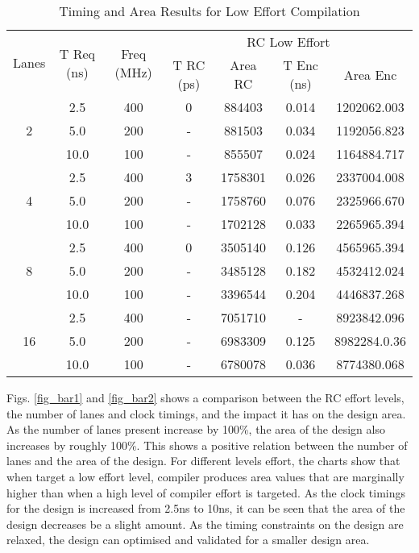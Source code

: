 \documentclass[conference]{IEEEtran}
\begin{document}
\begin{table}[!t]
	\renewcommand{\arraystretch}{1.3}
	\caption{Timing and Area Results for Low Effort Compilation }
	\label{table_example2}
	\centering
	\begin{tabular}{|c|c|c|c|c|c|c|}
		\hline
		\multirow{3}{*}{Lanes} & \multirow{3}{0.8cm}{T Req (ns)} &\multirow{3}{0.7cm}{Freq (MHz)} & \multicolumn{4}{|c|}{RC Low Effort}\\  \cline{4-7}
		&&&\multirow{2}{0.7cm}{T RC (ps)} & \multirow{2}{0.8cm}{Area RC} & \multirow{2}{0.8cm}{T Enc (ns)} & \multirow{2}{0.8cm}{Area Enc}\\
		&&&&&&\\
		\hline
		\multirow{3}{*}{2}&2.5&400&0&884403&0.014&1202062.003\\
		\cline{2-7}
		&5.0&200&-&881503&0.034&1192056.823\\
		\cline{2-7}
		&10.0&100&-&855507&0.024&1164884.717\\
		\hline
		\multirow{3}{*}{4}&2.5&400&3&1758301&0.026&2337004.008\\
		\cline{2-7}
		&5.0&200&-&1758760&0.076&2325966.670\\
		\cline{2-7}
		&10.0&100&-&1702128&0.033&2265965.394\\
		\hline
		\multirow{3}{*}{8}&2.5&400&0&3505140&0.126&4565965.394\\
		\cline{2-7}
		&5.0&200&-&3485128&0.182&4532412.024\\
		\cline{2-7}
		&10.0&100&-&3396544&0.204&4446837.268\\
		\hline
		\multirow{3}{*}{16}&2.5&400&-&7051710&-&8923842.096\\
		\cline{2-7}
		&5.0&200&-&6983309&0.125&8982284.0.36\\
		\cline{2-7}
		&10.0&100&-&6780078&0.036&8774380.068\\
		\hline
	\end{tabular}
\end{table}

Figs. \ref{fig_bar1} and \ref{fig_bar2} shows a comparison between the RC effort levels, the number of lanes and clock timings, and the impact it has on the design area. As the number of lanes present increase by 100\%, the area of the design also increases by roughly 100\%. This shows a positive relation between the number of lanes and the area of the design. For different levels effort, the charts show that  when target a low effort level, compiler  produces area values that are marginally higher than when a high level of compiler effort is targeted. As the clock timings for the design is increased from 2.5ns to 10ns, it can be seen that the area of the design decreases be a slight amount. As the timing constraints on the design are relaxed, the design can optimised and validated for a smaller design area. 
\newline
\end{document}
